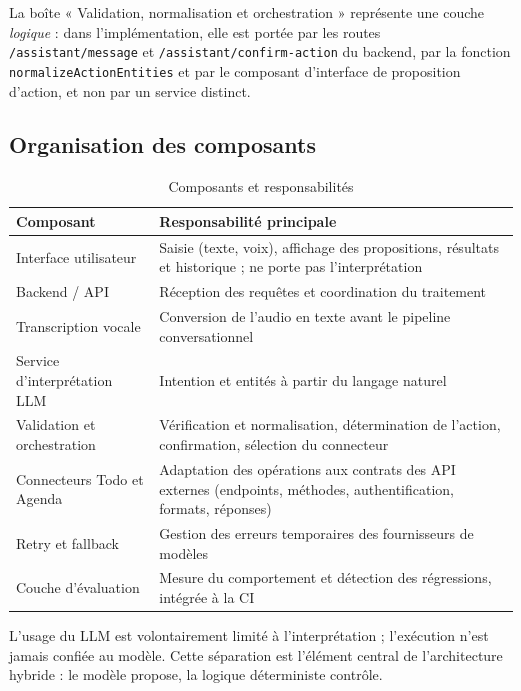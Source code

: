 \documentclass[11pt,a4paper,openany,oneside]{report}
\begin{document}
La boîte « Validation, normalisation et orchestration » représente une couche \emph{logique} : dans l'implémentation, elle est portée par les routes \texttt{/assistant/message} et \texttt{/assistant/confirm-action} du backend, par la fonction \texttt{normalizeActionEntities} et par le composant d'interface de proposition d'action, et non par un service distinct.

\subsection{Organisation des composants}
\begin{table}[htbp]
\centering\small
\caption{Composants et responsabilités}\label{tab:composants}
\begin{tabularx}{\textwidth}{@{}p{4cm}X@{}}
\toprule
\textbf{Composant} & \textbf{Responsabilité principale} \\
\midrule
Interface utilisateur & Saisie (texte, voix), affichage des propositions, résultats et historique ; ne porte pas l'interprétation \\
Backend / API & Réception des requêtes et coordination du traitement \\
Transcription vocale & Conversion de l'audio en texte avant le pipeline conversationnel \\
Service d'interprétation LLM & Intention et entités à partir du langage naturel \\
Validation et orchestration & Vérification et normalisation, détermination de l'action, confirmation, sélection du connecteur \\
Connecteurs Todo et Agenda & Adaptation des opérations aux contrats des API externes (endpoints, méthodes, authentification, formats, réponses) \\
Retry et fallback & Gestion des erreurs temporaires des fournisseurs de modèles \\
Couche d'évaluation & Mesure du comportement et détection des régressions, intégrée à la CI \\
\bottomrule
\end{tabularx}
\end{table}

L'usage du LLM est volontairement limité à l'interprétation ; l'exécution n'est jamais confiée au modèle. Cette séparation est l'élément central de l'architecture hybride : le modèle propose, la logique déterministe contrôle.
\end{document}
